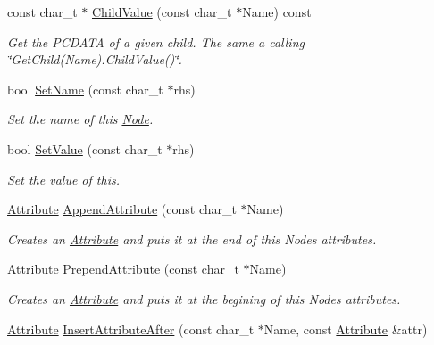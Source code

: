 \begin{DoxyCompactItemize}
const char\_\-t $\ast$ \hyperlink{classphys_1_1xml_1_1Node_aa8ce075bf47cb586b586800576569744}{ChildValue} (const char\_\-t $\ast$Name) const 
\begin{DoxyCompactList}\small\item\em Get the PCDATA of a given child. The same a calling \char`\"{}GetChild(Name).ChildValue()\char`\"{}. \item\end{DoxyCompactList}\item 
bool \hyperlink{classphys_1_1xml_1_1Node_a81ae067921c4a37fae118c76c2af375f}{SetName} (const char\_\-t $\ast$rhs)
\begin{DoxyCompactList}\small\item\em Set the name of this \hyperlink{classphys_1_1xml_1_1Node}{Node}. \item\end{DoxyCompactList}\item 
bool \hyperlink{classphys_1_1xml_1_1Node_a50ff9948dac721339561ed3442fb7034}{SetValue} (const char\_\-t $\ast$rhs)
\begin{DoxyCompactList}\small\item\em Set the value of this. \item\end{DoxyCompactList}\item 
\hyperlink{classphys_1_1xml_1_1Attribute}{Attribute} \hyperlink{classphys_1_1xml_1_1Node_a09ae0a1499b13de2db447fc95dd3b747}{AppendAttribute} (const char\_\-t $\ast$Name)
\begin{DoxyCompactList}\small\item\em Creates an \hyperlink{classphys_1_1xml_1_1Attribute}{Attribute} and puts it at the end of this Nodes attributes. \item\end{DoxyCompactList}\item 
\hyperlink{classphys_1_1xml_1_1Attribute}{Attribute} \hyperlink{classphys_1_1xml_1_1Node_aa64f2de951032177731e8cba7282529d}{PrependAttribute} (const char\_\-t $\ast$Name)
\begin{DoxyCompactList}\small\item\em Creates an \hyperlink{classphys_1_1xml_1_1Attribute}{Attribute} and puts it at the begining of this Nodes attributes. \item\end{DoxyCompactList}\item 
\hyperlink{classphys_1_1xml_1_1Attribute}{Attribute} \hyperlink{classphys_1_1xml_1_1Node_a8444ca5b7b7411fb9fc4c002ea7beb9e}{InsertAttributeAfter} (const char\_\-t $\ast$Name, const \hyperlink{classphys_1_1xml_1_1Attribute}{Attribute} \&attr)

\end{DoxyCompactItemize}
